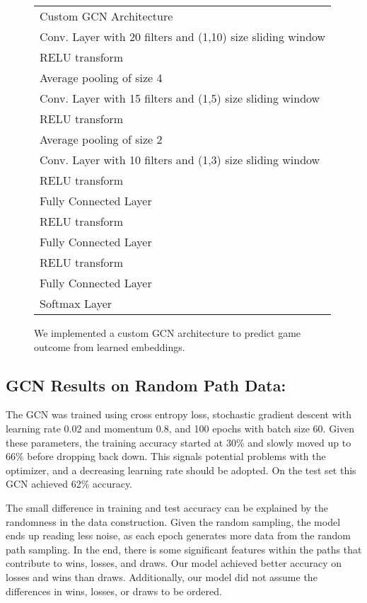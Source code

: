 \begin{figure}[h]
  \label{fig:GCN_architecture}
  \centering
\begin{tabular}{l |}
    \rowcolor{gray!20}
    Custom GCN Architecture \\
    \rowcolor{blue!20}
    Conv. Layer with 20 filters and (1,10) size sliding window \\
    \rowcolor{green!20}
    RELU transform \\
    \rowcolor{blue!20}
    Average pooling of size 4 \\
    \rowcolor{green!20}
    Conv. Layer with 15 filters and (1,5) size sliding window \\
    \rowcolor{blue!20}
    RELU transform \\
    \rowcolor{green!20}
    Average pooling of size 2 \\
    \rowcolor{blue!20}
    Conv. Layer with 10 filters and (1,3) size sliding window \\
    \rowcolor{green!20}
    RELU transform \\
    \rowcolor{blue!20}
    Fully Connected Layer \\
    \rowcolor{green!20}
    RELU transform \\
    \rowcolor{blue!20}
    Fully Connected Layer \\
    \rowcolor{green!20}
    RELU transform \\
    \rowcolor{blue!20}
    Fully Connected Layer \\
    \rowcolor{green!20}
    Softmax Layer \\
\end{tabular}
\caption{We implemented a custom GCN architecture to predict game outcome from learned embeddings.}
\end{figure}

\subsection{GCN Results on Random Path Data:}

The GCN was trained using cross entropy loss, stochastic gradient descent with learning rate 0.02 and momentum 0.8, and 100 epochs with batch size 60. Given these parameters, the training accuracy started at 30\% and slowly moved up to 66\% before dropping back down. This signals potential problems with the optimizer, and a decreasing learning rate should be adopted. On the test set this GCN achieved 62\% accuracy. 

The small difference in training and test accuracy can be explained by the randomness in the data construction. Given the random sampling, the model ends up reading less noise, as each epoch generates more data from the random path sampling. In the end, there is some significant features within the paths that contribute to wins, losses, and draws. Our model achieved better accuracy on losses and wins than draws. Additionally, our model did not assume the differences in wins, losses, or draws to be ordered. 

